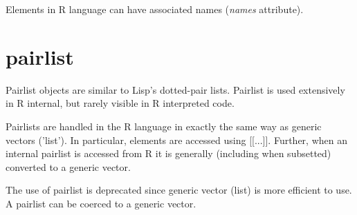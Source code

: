 Elements in R language can have associated names ({\it names}
attribute).


\section{pairlist}
\label{sec:pairlist}

Pairlist objects are similar to Lisp's dotted-pair lists. Pairlist is
used extensively in R internal, but rarely visible in R interpreted
code. 

Pairlists are handled in the R language in exactly the same way as
generic vectors ('list'). In particular, elements are accessed
using [[...]]. Further, when an internal pairlist is accessed from R
it is generally (including when subsetted) converted to a generic
vector.

The use of pairlist is deprecated since generic vector (list) is more
efficient to use. A pairlist can be coerced to a generic vector.

